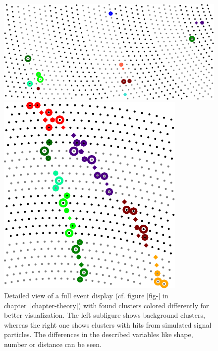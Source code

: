 \begin{figure}
  \centering
  \begin{minipage}{0.58\linewidth}
    \centering
    \includegraphics[scale=0.8]{figures/workflow/cluster_display_background.pdf}
  \end{minipage}
  \begin{minipage}{0.4\linewidth}
    \centering
    \includegraphics[scale=0.8]{figures/workflow/cluster_display_signal.pdf}
  \end{minipage}
  \caption{Detailed view of a full event display (cf. figure \ref{fig-} in chapter~\ref{chapter-theory}) with found clusters colored differently for better visualization. The left subfigure shows background clusters, whereas the right one shows clusters with hits from simulated signal particles. The differences in the described variables like shape, number or distance can be seen.}
  \label{fig-cluster-versus}
\end{figure}


